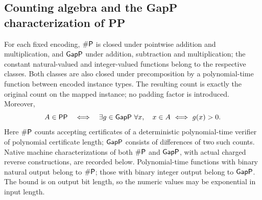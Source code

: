 \begin{result}
\subsection{Counting algebra and the GapP characterization of PP}
For each fixed encoding, $\#\mathsf{P}$ is closed under pointwise addition and
multiplication, and $\mathsf{GapP}$ under addition, subtraction and multiplication;
the constant natural-valued and integer-valued functions belong to the
respective classes. Both classes are also closed under precomposition by a
polynomial-time function between encoded instance types. The resulting count
is exactly the original count on the mapped instance; no padding factor is
introduced. Moreover,
\[
A\in\cc{PP}\quad\Longleftrightarrow\quad
\exists g\in\cc{GapP}\ \forall x,\quad x\in A\ \Longleftrightarrow\ g(x)>0.
\]
Here $\#\mathsf{P}$ counts accepting certificates of a deterministic polynomial-time
verifier of polynomial certificate length; $\mathsf{GapP}$ consists of differences
of two such counts. Native machine characterizations of both $\#\mathsf{P}$ and
$\mathsf{GapP}$, with actual charged reverse constructions, are recorded below.
\citep{Valiant1979,FennerFortnowKurtz1994}
Polynomial-time functions with binary natural output belong to $\#\mathsf{P}$;
those with binary integer output belong to $\mathsf{GapP}$. The bound is on output
bit length, so the numeric values may be exponential in input length.
\citep[Theorem 3.5]{Fortnow1997}


\end{result}
